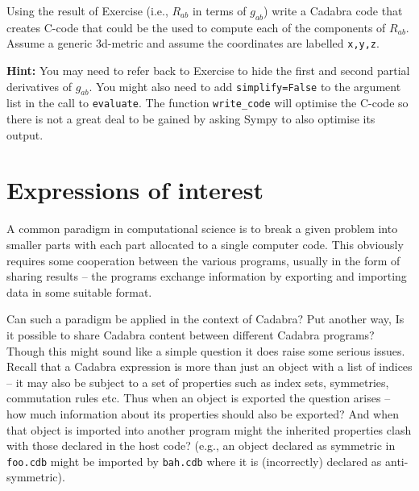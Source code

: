 \documentclass[a4paper,12pt]{article}
\numberwithin{equation}{section}%
\begin{document}

\begin{Exercises}

   \begin{Exercise}
      Using the result of Exercise  (i.e., $R_{ab}$ in terms of $g_{ab}$)
      write a Cadabra code that creates C-code that could be the used to compute each of the
      components of $R_{ab}$. Assume a generic 3d-metric and assume the coordinates are
      labelled \verb|x,y,z|.

      {\bf Hint:} You may need to refer back to Exercise  to hide the first
                  and second partial derivatives of $g_{ab}$. You might also need to add
                  \verb|simplify=False| to the argument list in the call to \verb|evaluate|.
                  The function \verb|write_code| will optimise the C-code so there is not a
                  great deal to be gained by asking Sympy to also optimise its output.
   \end{Exercise}

\end{Exercises}

\clearpage

\section{Expressions of interest}
\label{sec:ex-08}
\ResetCounters



A common paradigm in computational science is to break a given problem into smaller parts
with each part allocated to a single computer code. This obviously requires some cooperation
between the various programs, usually in the form of sharing results -- the programs exchange
information by exporting and importing data in some suitable format.

Can such a paradigm be applied in the context of Cadabra? Put another way, Is it possible to
share Cadabra content between different Cadabra programs? Though this might sound like a
simple question it does raise some serious issues. Recall that a Cadabra expression is more
than just an object with a list of indices -- it may also be subject to a set of properties
such as index sets, symmetries, commutation rules etc. Thus when an object is exported the
question arises -- how much information about its properties should also be exported? And
when that object is imported into another program might the inherited properties clash with
those declared in the host code? (e.g., an object declared as symmetric in \verb|foo.cdb|
might be imported by \verb|bah.cdb| where it is (incorrectly) declared as
anti-symmetric).
\end{document}
